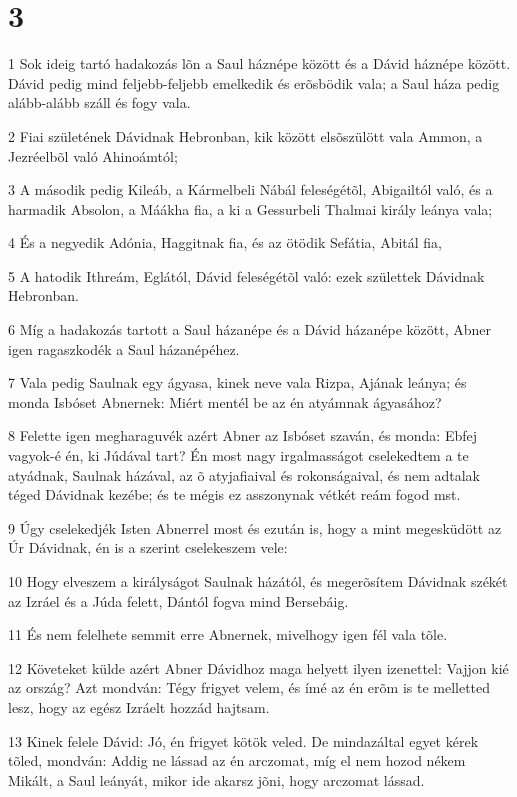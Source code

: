\chapter{3}

\par 1 Sok ideig tartó hadakozás lõn a Saul háznépe között és a Dávid háznépe között. Dávid pedig mind feljebb-feljebb emelkedik és erõsbödik vala; a Saul háza pedig alább-alább száll és fogy vala.
\par 2 Fiai születének Dávidnak Hebronban, kik között elsõszülött vala Ammon, a  Jezréelbõl való Ahinoámtól;
\par 3 A második pedig Kileáb, a Kármelbeli Nábál feleségétõl, Abigailtól való, és a harmadik Absolon, a Máákha fia, a ki a Gessurbeli Thalmai király leánya vala;
\par 4 És a negyedik Adónia, Haggitnak fia, és az ötödik Sefátia, Abitál fia,
\par 5 A hatodik Ithreám, Eglától, Dávid feleségétõl való: ezek születtek Dávidnak Hebronban.
\par 6 Míg a hadakozás tartott a Saul házanépe és a Dávid házanépe között, Abner igen ragaszkodék a Saul házanépéhez.
\par 7 Vala pedig Saulnak egy ágyasa, kinek neve vala Rizpa, Ajának leánya; és monda Isbóset Abnernek: Miért mentél be az én atyámnak ágyasához?
\par 8 Felette igen megharaguvék azért Abner az Isbóset szaván, és monda: Ebfej vagyok-é én, ki Júdával tart? Én most nagy irgalmasságot cselekedtem a te atyádnak, Saulnak házával, az õ atyjafiaival és rokonságaival, és nem adtalak téged Dávidnak kezébe; és te mégis ez asszonynak vétkét reám fogod mst.
\par 9 Úgy cselekedjék Isten Abnerrel most és ezután is, hogy a mint megesküdött az Úr Dávidnak, én is a szerint cselekeszem  vele:
\par 10 Hogy elveszem a királyságot Saulnak házától, és megerõsítem Dávidnak székét az Izráel és a Júda felett, Dántól fogva mind Bersebáig.
\par 11 És nem felelhete semmit erre Abnernek, mivelhogy igen fél vala tõle.
\par 12 Követeket külde azért Abner Dávidhoz maga helyett ilyen izenettel: Vajjon kié az ország? Azt mondván: Tégy frigyet velem, és ímé az én erõm is te melletted lesz, hogy az egész Izráelt hozzád hajtsam.
\par 13 Kinek felele Dávid: Jó, én frigyet kötök veled. De mindazáltal egyet kérek tõled, mondván: Addig ne lássad az én arczomat, míg el nem hozod nékem Mikált, a Saul leányát, mikor ide akarsz jõni, hogy arczomat lássad.
